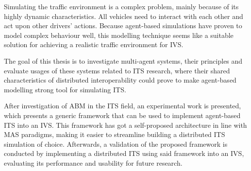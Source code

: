 \documentclass[titlepage, 12pt, draft]{article}
\begin{document}
Simulating the traffic environment is a complex problem, mainly because of
its highly dynamic characteristics. All vehicles  need to interact with
each other and act upon other drivers' actions. Because agent-based simulations
have proven to model complex behaviour well, this modelling technique seems like
a suitable solution for achieving a realistic traffic environment for IVS.

The goal of this thesis is to investigate multi-agent systems, their 
principles and evaluate usages of these systems related to ITS research, where 
their shared characteristics of distributed interoperability could prove to make 
agent-based modelling strong tool for simulating ITS.

After investigation of ABM in the ITS field, an experimental work is presented, which presents
a generic framework that can be used to implement agent-based ITS into an IVS.  This framework
has got a self-proposed architecture in line with MAS paradigms, making it easier to streamline
building a distributed ITS simulation of choice. Afterwards, a validation of the proposed
framework is conducted by implementing a distributed ITS using said framework into an IVS,
evaluating its performance and usability for future research.







\printbibliography
\end{document}
